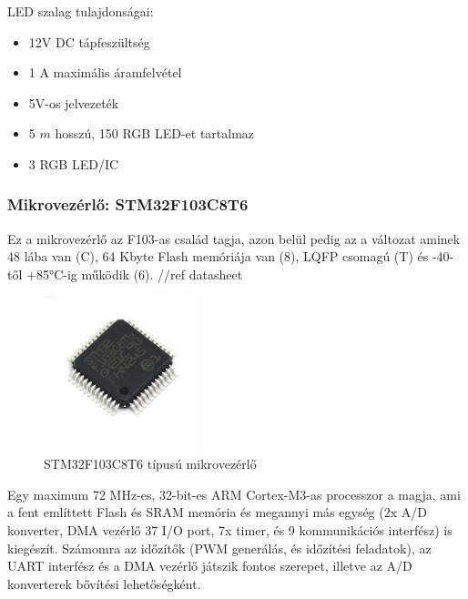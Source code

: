 \documentclass[../main.tex]{subfiles}
\begin{document}
            LED szalag tulajdonságai:
            \begin{itemize}
                \item 12V DC tápfeszültség
                \item 1 A maximális áramfelvétel
                \item 5V-os jelvezeték
                \item 5 $m$ hosszú, 150 RGB LED-et tartalmaz
                \item 3 RGB LED/IC
            \end{itemize}
            
        \subsubsection{Mikrovezérlő: STM32F103C8T6}
            Ez a mikrovezérlő az F103-as család tagja, azon belül pedig az a változat aminek 48 lába van (C), 64 Kbyte Flash memóriája van (8), LQFP csomagú (T) és -40-től +85°C-ig működik (6). //ref datasheet
            
            \begin{figure}[h!] %
                \centering
                    \includegraphics[width=4.5cm]{resources/pcb_res/stm32f103c8t6.jpg}
                \caption{STM32F103C8T6 típusú mikrovezérlő}
                \label{fig:stm32f103_ic}
            \end{figure}
            
            Egy maximum 72 MHz-es, 32-bit-es ARM Cortex-M3-as processzor a magja, ami a fent említtett Flash és SRAM memória és megannyi más egység (2x A/D konverter, DMA vezérlő 37 I/O port, 7x timer, és 9 kommunikációs interfész) is kiegészít. Számomra az időzítők (PWM generálás, és időzítési feladatok), az UART interfész és a DMA vezérlő játszik fontos szerepet, illetve az A/D konverterek bővítési lehetőségként.
            
\end{document}
